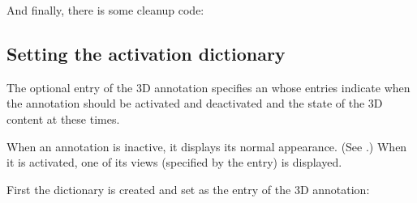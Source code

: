 \documentclass[letterpaper,12pt,english,openany,oneside]{sphinxmanual}
\begin{document}
\begin{sphinxVerbatim}[commandchars=\\\{\}]
   
      
\end{sphinxVerbatim}

And finally, there is some cleanup code:

\begin{sphinxVerbatim}[commandchars=\\\{\}]
  
  
\end{sphinxVerbatim}


\subsection{Setting the activation dictionary}
\label{\detokenize{Plugins_3D_samples:setting-the-activation-dictionary}}
The optional  entry of the 3D annotation specifies an  whose entries indicate when the annotation should be activated and deactivated and the state of the 3D content at these times.

When an annotation is inactive, it displays its normal appearance. (See .) When it is activated, one of its views (specified by the  entry) is displayed.

First the dictionary is created and set as the  entry of the 3D annotation:

\begin{sphinxVerbatim}[commandchars=\\\{\}]
     
    
\end{sphinxVerbatim}
\end{document}
